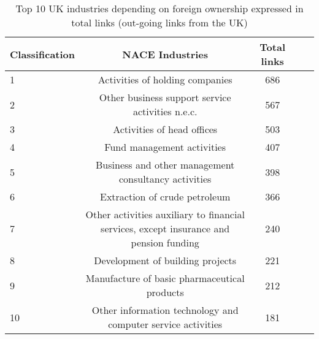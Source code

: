 \begin{table}[!ht]
\begin{adjustwidth}{-2.25in}{0in}
\caption{Top 10 UK industries depending on foreign ownership expressed in total links (out-going links from the UK)\label{tab:uk_outgoinglinks}}
\centering
\medskip
\begin{tabular}{|l|c|c|c|c|}
\hline
Classification  & NACE Industries & Total links \\ 
\hline
1 & Activities of holding companies &   686  \\
\hline
2 & Other business support service activities n.e.c.  &  567  \\
\hline
3 & Activities of head offices &  503 \\
\hline
4 &  Fund management activities &   407  \\
\hline
5 &  Business and other management consultancy activities &  398  \\
\hline
6 &  Extraction of crude petroleum &  366  \\
\hline
7 &  Other activities auxiliary to financial services, except insurance and pension funding & 240 \\
\hline
8 &  Development of building projects  & 221 \\
\hline
9 &  Manufacture of basic pharmaceutical products &  212 \\
\hline
10 &  Other information technology and computer service activities  &  181 \\
\hline
\end{tabular}
\end{adjustwidth}
\end{table}


